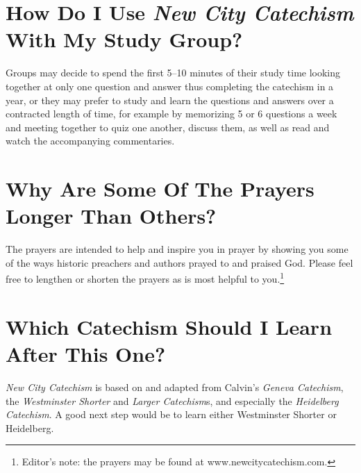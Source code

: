 \section[How Do I Use {\em New City Catechism}\/ With My Study Group?][Catechism With Study Group]{How Do I Use {\em New City Catechism}\/ With My Study Group?}

Groups may decide to spend the first 5--10 minutes of their study time looking together at only one question and answer thus completing the catechism in a year, or they may prefer to study and learn the questions and answers over a contracted length of time, for example by memorizing 5 or 6 questions a week and meeting together to quiz one another, discuss them, as well as read and watch the accompanying commentaries.

\section[Why Are Some Of The Prayers Longer Than Others?][Why Are Some Prayers Longer?]{Why Are Some Of The Prayers Longer Than Others?}

The prayers are intended to help and inspire you in prayer by showing you some of the ways historic preachers and authors prayed to and praised God. Please feel free to lengthen or shorten the prayers as is most helpful to you.\footnote{Editor's note: the prayers may be found at www.\hspace{0em}new\hspace{0em}city\hspace{0em}cate\hspace{0em}chism.\hspace{0em}com.}

\section[Which Catechism Should I Learn After This One?][Next Catechism?]{Which Catechism Should I Learn After This One?}

\emph{New City Catechism}\/ is based on and adapted from Calvin's {\em Geneva Catechism}, the {\em Westminster Shorter}\/ and {\em Larger Catechism}s, and especially the {\em Heidelberg Catechism}. A good next step would be to learn either Westminster Shorter or Heidelberg.

